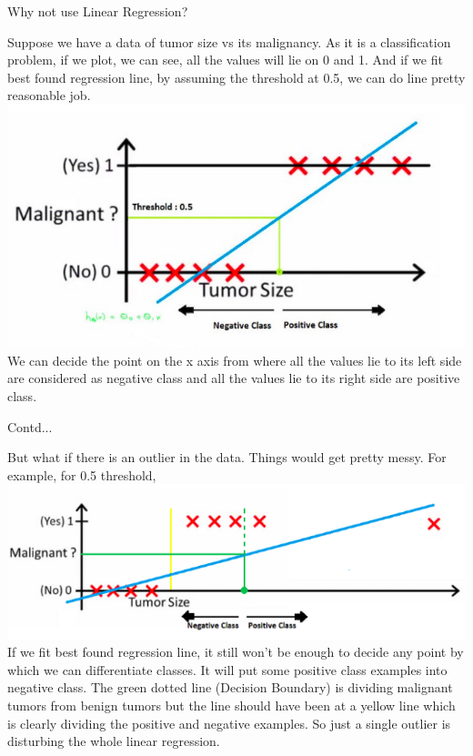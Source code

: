 \documentclass{beamer}
\begin{document}
\begin{frame}{Why not use Linear Regression?}
	\begin{flushleft}
		Suppose we have a data of tumor size vs its malignancy. As it is a classification problem, if we plot, we can see, all the values will lie on 0 and 1. And if we fit best found regression line, by assuming the threshold at 0.5, we can do line pretty reasonable job.
		\includegraphics[scale=0.3]{Log_reg_2}\\
		We can decide the point on the x axis from where all the values lie to its left side are considered as negative class and all the values lie to its right side are positive class.
	\end{flushleft}
\end{frame}

\begin{frame}{Contd...}
\begin{flushleft}
But what if there is an outlier in the data. Things would get pretty messy. For example, for 0.5 threshold,\\
	\includegraphics[scale=0.48]{Log_reg_3}\\
	If we fit best found regression line, it still won’t be enough to decide any point by which we can differentiate classes. It will put some positive class examples into negative class. The green dotted line (Decision Boundary) is dividing malignant tumors from benign tumors but the line should have been at a yellow line which is clearly dividing the positive and negative examples. So just a single outlier is disturbing the whole linear regression.
\end{flushleft}
\end{frame}
\end{document}

